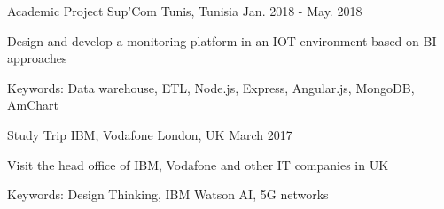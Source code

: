 \begin{cventries}
  \cventry
    {Academic Project} %
    {Sup'Com} %
    {Tunis, Tunisia} %
    {Jan. 2018 - May. 2018} %
    {
      \begin{cvitems} %
        \item {Design and develop a monitoring platform in an IOT environment based on BI approaches }
        \item {Keywords: Data warehouse, ETL, Node.js, Express, Angular.js, MongoDB, AmChart}
      \end{cvitems}
    }

  \cventry
    {Study Trip} %
    {IBM, Vodafone } %
    {London, UK} %
    {March 2017 } %
    {
      \begin{cvitems} %
        \item {Visit the head office of IBM, Vodafone and other IT companies in UK}
        \item {Keywords: Design Thinking, IBM Watson AI, 5G networks }
      \end{cvitems}
    }

\end{cventries}
